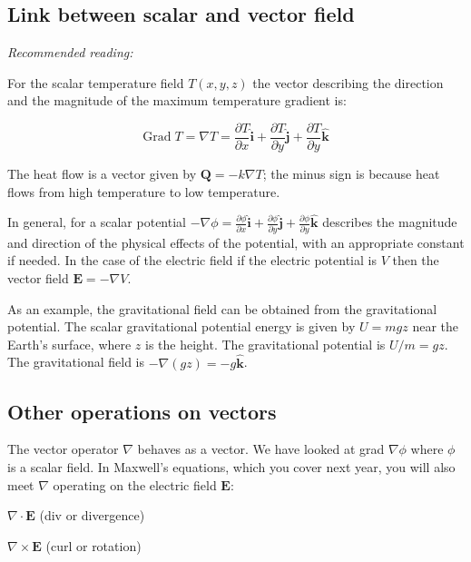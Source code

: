 \documentclass[
  letterpaper,
  DIV=11,
  numbers=noendperiod]{scrreprt}
\begin{document}
\subsection{Link between scalar and vector
field}\label{link-between-scalar-and-vector-field}

\emph{Recommended reading:}

For the scalar temperature field \(T(x,y,z)\) the vector describing the
direction and the magnitude of the maximum temperature gradient is:

\begin{equation}
 \text{Grad} \; T = \nabla T = \frac{\partial T} {\partial x} \hat{\mathbf{i}} + \frac{\partial T}{\partial y} \hat{\mathbf{j}} + \frac{\partial T}{\partial y} \hat{\mathbf{k}}
\end{equation}

The heat flow is a vector given by \(\mathbf{Q} = -k \nabla T\); the
minus sign is because heat flows from high temperature to low
temperature.

In general, for a scalar potential
\(-\nabla \phi = \frac{\partial \phi} {\partial x} \hat{\mathbf{i}} + \frac{\partial \phi}{\partial y} \hat{\mathbf{j}} + \frac{\partial \phi}{\partial y} \hat{\mathbf{k}}\)
describes the magnitude and direction of the physical effects of the
potential, with an appropriate constant if needed. In the case of the
electric field if the electric potential is \(V\) then the vector field
\(\mathbf{E} = -\nabla V\).

As an example, the gravitational field can be obtained from the
gravitational potential. The scalar gravitational potential energy is
given by \(U = mgz\) near the Earth's surface, where \(z\) is the
height. The gravitational potential is \(U/m = gz\). The gravitational
field is \(-\nabla(gz)=-g \hat{\mathbf{k}}\).

\subsection{Other operations on
vectors}\label{other-operations-on-vectors}

The vector operator \(\nabla\) behaves as a vector. We have looked at
grad \(\nabla\phi\) where \(\phi\) is a scalar field. In Maxwell's
equations, which you cover next year, you will also meet \(\nabla\)
operating on the electric field \(\mathbf{E}\):

\(\nabla \cdot \mathbf{E}\) (div or divergence)

\(\nabla \times \mathbf{E}\) (curl or rotation)
\end{document}
